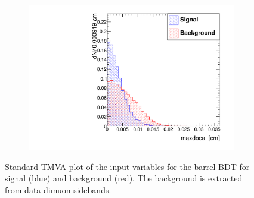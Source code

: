 \documentclass[10pt,a4paper]{article}
\begin{document}
\begin{figure}
\begin{subfigure}[b]{0.2\textwidth}
                \includegraphics[width=\textwidth]{Figures/maxdoca_barrel}
                \label{fig:maxdocaBarrel}
        \end{subfigure}
        \caption{Standard TMVA plot of the input variables for the barrel BDT for signal (blue) and background (red). The background is extracted from data dimuon sidebands.}
        \label{fig:TMVAPlotsBarrel}
\end{figure}
\end{document}
